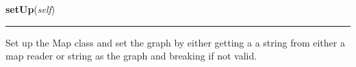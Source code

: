 \hspace{.8\funcindent}\begin{boxedminipage}{\funcwidth}

    \raggedright \textbf{setUp}(\textit{self})

    \vspace{-1.5ex}

    \rule{\textwidth}{0.5\fboxrule}
\setlength{\parskip}{2ex}
    Set up the Map class and set the graph by either getting a a string 
    from either a map reader or string as the graph and breaking if not 
    valid.

\setlength{\parskip}{1ex}
    \end{boxedminipage}

    \label{UnBlockMeSolver:Map:Map:Map:isWallOrGoal}

    \vspace{0.5ex}

